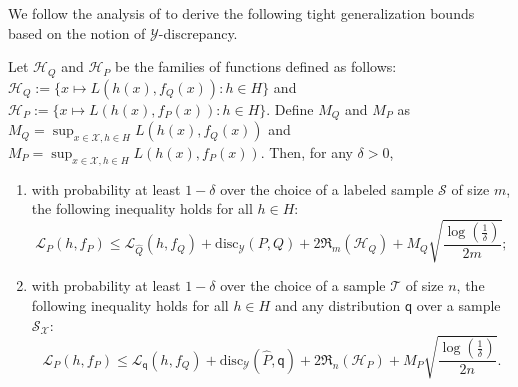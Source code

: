 \documentclass[twoside,11pt]{article}
\newcommand{\h}{\widehat}
\newcommand{\cH}{{\mathcal H}}
\newcommand{\cL}{{\mathcal L}}
\newcommand{\cS}{{\mathcal S}}
\newcommand{\cX}{{\mathcal X}}
\newcommand{\cY}{{\mathcal Y}}
\newcommand{\1}{\mat{1}}
\newcommand{\qq}{{\mathsf q}}
\newcommand{\dis}{\mathrm{disc}}
\newcommand{\Rad}{\mathfrak{R}}
\begin{document}
We follow the analysis of \citep{drift} to derive the following tight
generalization bounds based on the notion of $\cY$-discrepancy.

\begin{proposition}
\label{prop:ydiscbounds}

Let $\cH_Q$ and $\cH_P$ be the families of functions defined as
follows: $\cH_Q := \{ x \mapsto L(h(x),f_Q(x)) \colon h \in H \}$ and
$\cH_P := \{ x \mapsto L(h(x), f_P(x)) \colon h \in H \}$. Define
$M_Q$ and $M_P$ as
$M_Q = \sup_{x \in \mathcal{X}, h \in H} L(h(x), f_Q(x))$ and
$M_P = \sup_{x \in \mathcal{X}, h \in H} L(h(x), f_P(x))$.
Then, for any $\delta > 0$,
\begin{enumerate}
\item with probability at least $1 - \delta$ over the choice of a
labeled sample $\cS$ of size $m$, the following inequality holds
for all $h \in H$:\\[-.4cm]
\begin{equation}
\label{eq:truedisclearning}
 \cL_{P} (h, f_P) \leq \cL_{\h Q}(h, f_Q) + \dis_\cY(P, Q)
+ 2 \Rad_m(\cH_Q) + M_Q \sqrt{\frac{\log(\frac{1}{\delta})}{2 m}};
\end{equation}
\item with probability at least $1 - \delta$ over the choice of a
  sample $\mathcal{T}$ of size $n$, the following inequality holds for
  all $h \in H$ and
  any distribution $\qq$ over a sample $\cS_{\cX}$:\\[-.4cm]
\begin{equation}
\label{eq:empdisclearning}
\cL_{P}(h, f_P) \leq \cL_{\qq}(h, f_Q)  + \dis_\cY(\h P, \qq)
 + 2 \Rad_n(\cH_P) + M_P \sqrt{\frac{\log(\frac{1}{\delta})}{2 n}}.
\end{equation}
\end{enumerate}
\end{proposition}
\end{document}
